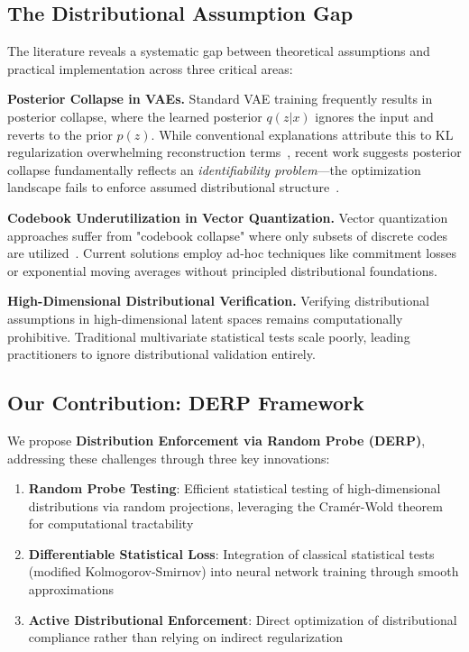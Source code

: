 \documentclass{article}
\begin{document}
\subsection{The Distributional Assumption Gap}

The literature reveals a systematic gap between theoretical assumptions and practical implementation across three critical areas:

\textbf{Posterior Collapse in VAEs.} Standard VAE training frequently results in posterior collapse, where the learned posterior $q(z|x)$ ignores the input and reverts to the prior $p(z)$. While conventional explanations attribute this to KL regularization overwhelming reconstruction terms~\citep{bowman2015generating}, recent work suggests posterior collapse fundamentally reflects an \emph{identifiability problem}—the optimization landscape fails to enforce assumed distributional structure~\citep{lucas2019don, wang2023posterior}.

\textbf{Codebook Underutilization in Vector Quantization.} Vector quantization approaches suffer from "codebook collapse" where only subsets of discrete codes are utilized~\citep{van2017neural}. Current solutions employ ad-hoc techniques like commitment losses or exponential moving averages without principled distributional foundations.

\textbf{High-Dimensional Distributional Verification.} Verifying distributional assumptions in high-dimensional latent spaces remains computationally prohibitive. Traditional multivariate statistical tests scale poorly, leading practitioners to ignore distributional validation entirely.

\subsection{Our Contribution: DERP Framework}

We propose \textbf{Distribution Enforcement via Random Probe (DERP)}, addressing these challenges through three key innovations:

\begin{enumerate}
\item \textbf{Random Probe Testing}: Efficient statistical testing of high-dimensional distributions via random projections, leveraging the Cramér-Wold theorem for computational tractability
\item \textbf{Differentiable Statistical Loss}: Integration of classical statistical tests (modified Kolmogorov-Smirnov) into neural network training through smooth approximations
\item \textbf{Active Distributional Enforcement}: Direct optimization of distributional compliance rather than relying on indirect regularization
\end{enumerate}
\end{document}
